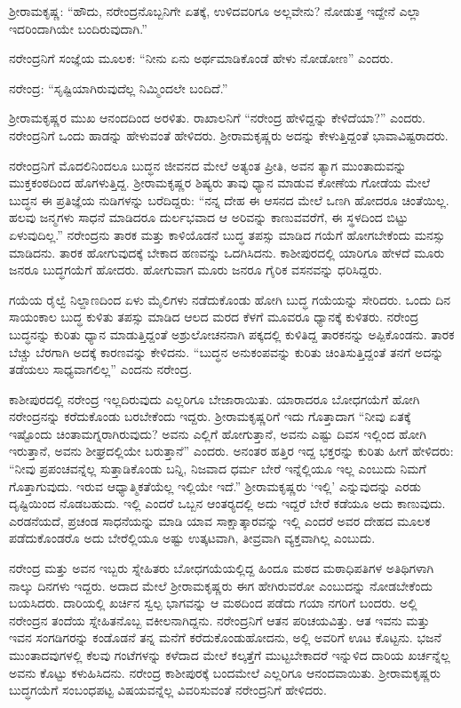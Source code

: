 ಶ‍್ರೀರಾಮಕೃಷ್ಣ: “ಹೌದು, ನರೇಂದ್ರನೊಬ್ಬನಿಗೇ ಏತಕ್ಕೆ, ಉಳಿದವರಿಗೂ ಅಲ್ಲವೇನು? ನೋಡುತ್ತ ಇದ್ದೇನೆ ಎಲ್ಲಾ ಇದರಿಂದಾಗಿಯೇ ಬಂದಿರುವುದಾಗಿ.”

ನರೇಂದ್ರನಿಗೆ ಸಂಜ್ಞೆಯ ಮೂಲಕ: “ನೀನು ಏನು ಅರ್ಥಮಾಡಿಕೊಂಡೆ ಹೇಳು ನೋಡೋಣ” ಎಂದರು.

ನರೇಂದ್ರ: “ಸೃಷ್ಟಿಯಾಗಿರುವುದೆಲ್ಲ ನಿಮ್ಮಿಂದಲೇ ಬಂದಿದೆ.”

ಶ‍್ರೀರಾಮಕೃಷ್ಣರ ಮುಖ ಆನಂದದಿಂದ ಅರಳಿತು. ರಾಖಾಲನಿಗೆ “ನರೇಂದ್ರ ಹೇಳಿದ್ದನ್ನು ಕೇಳಿದೆಯಾ?” ಎಂದರು. ನರೇಂದ್ರನಿಗೆ ಒಂದು ಹಾಡನ್ನು ಹೇಳುವಂತೆ ಹೇಳಿದರು. ಶ‍್ರೀರಾಮಕೃಷ್ಣರು ಅದನ್ನು ಕೇಳುತ್ತಿದ್ದಂತೆ ಭಾವಾವಿಷ್ಟರಾದರು.

ನರೇಂದ್ರನಿಗೆ ಮೊದಲಿನಿಂದಲೂ ಬುದ್ಧನ ಜೀವನದ ಮೇಲೆ ಅತ್ಯಂತ ಪ್ರೀತಿ, ಅವನ ತ್ಯಾಗ ಮುಂತಾದುವನ್ನು ಮುಕ್ತಕಂಠದಿಂದ ಹೊಗಳುತ್ತಿದ್ದ. ಶ‍್ರೀರಾಮಕೃಷ್ಣರ ಶಿಷ್ಯರು ತಾವು ಧ್ಯಾನ ಮಾಡುವ ಕೋಣೆಯ ಗೋಡೆಯ ಮೇಲೆ ಬುದ್ಧನ ಈ ಪ್ರತಿಜ್ಞೆಯ ನುಡಿಗಳನ್ನು ಬರೆದಿದ್ದರು: “ನನ್ನ ದೇಹ ಈ ಆಸನದ ಮೇಲೆ ಒಣಗಿ ಹೋದರೂ ಚಿಂತೆಯಿಲ್ಲ. ಹಲವು ಜನ್ಮಗಳು ಸಾಧನೆ ಮಾಡಿದರೂ ದುರ್ಲಭವಾದ ಆ ಅರಿವನ್ನು ಕಾಣುವವರೆಗೆ, ಈ ಸ್ಥಳದಿಂದ ಬಿಟ್ಟು ಏಳುವುದಿಲ್ಲ.” ನರೇಂದ್ರನು ತಾರಕ ಮತ್ತು ಕಾಳಿಯೊಡನೆ ಬುದ್ಧ ತಪಸ್ಸು ಮಾಡಿದ ಗಯೆಗೆ ಹೋಗಬೇಕೆಂದು ಮನಸ್ಸು ಮಾಡಿದನು. ತಾರಕ ಹೋಗುವುದಕ್ಕೆ ಬೇಕಾದ ಹಣವನ್ನು ಒದಗಿಸಿದನು. ಕಾಶೀಪುರದಲ್ಲಿ ಯಾರಿಗೂ ಹೇಳದೆ ಮೂರು ಜನರೂ ಬುದ್ಧಗಯೆಗೆ ಹೋದರು. ಹೋಗುವಾಗ ಮೂರು ಜನರೂ ಗೈರಿಕ ವಸನವನ್ನು ಧರಿಸಿದ್ದರು.

ಗಯೆಯ ರೈಲ್ವೆ ನಿಲ್ದಾಣದಿಂದ ಏಳು ಮೈಲಿಗಳು ನಡೆದುಕೊಂಡು ಹೋಗಿ ಬುದ್ಧ ಗಯೆಯನ್ನು ಸೇರಿದರು. ಒಂದು ದಿನ ಸಾಯಂಕಾಲ ಬುದ್ಧ ಕುಳಿತು ತಪಸ್ಸು ಮಾಡಿದ ಆಲದ ಮರದ ಕೆಳಗೆ ಮೂವರೂ ಧ್ಯಾನಕ್ಕೆ ಕುಳಿತರು. ನರೇಂದ್ರ ಬುದ್ಧನನ್ನು ಕುರಿತು ಧ್ಯಾನ ಮಾಡುತ್ತಿದ್ದಂತೆ ಅಶ್ರುಲೋಚನನಾಗಿ ಪಕ್ಕದಲ್ಲಿ ಕುಳಿತಿದ್ದ ತಾರಕನನ್ನು ಅಪ್ಪಿಕೊಂಡನು. ತಾರಕ ಬೆಚ್ಚು ಬೆರಗಾಗಿ ಅದಕ್ಕೆ ಕಾರಣವನ್ನು ಕೇಳಿದನು. “ಬುದ್ಧನ ಅನುಕಂಪವನ್ನು ಕುರಿತು ಚಿಂತಿಸುತ್ತಿದ್ದಂತೆ ತನಗೆ ಅದನ್ನು ತಡೆಯಲು ಸಾಧ್ಯವಾಗಲಿಲ್ಲ” ಎಂದನು ನರೇಂದ್ರ.

ಕಾಶೀಪುರದಲ್ಲಿ ನರೇಂದ್ರ ಇಲ್ಲದಿರುವುದು ಎಲ್ಲರಿಗೂ ಬೇಜಾರಾಯಿತು. ಯಾರಾದರೂ ಬೋಧಗಯೆಗೆ ಹೋಗಿ ನರೇಂದ್ರನನ್ನು ಕರೆದುಕೊಂಡು ಬರಬೇಕೆಂದು ಇದ್ದರು. ಶ‍್ರೀರಾಮಕೃಷ್ಣರಿಗೆ ಇದು ಗೊತ್ತಾದಾಗ “ನೀವು ಏತಕ್ಕೆ ಇಷ್ಟೊಂದು ಚಿಂತಾಮಗ್ನರಾಗಿರುವುದು? ಅವನು ಎಲ್ಲಿಗೆ ಹೋಗುತ್ತಾನೆ, ಅವನು ಎಷ್ಟು ದಿವಸ ಇಲ್ಲಿಂದ ಹೋಗಿ ಇರುತ್ತಾನೆ, ಅವನು ಶೀಘ್ರದಲ್ಲಿಯೇ ಬರುತ್ತಾನೆ” ಎಂದರು. ಅನಂತರ ಹತ್ತಿರ ಇದ್ದ ಭಕ್ತರನ್ನು ಕುರಿತು ಹೀಗೆ ಹೇಳಿದರು: “ನೀವು ಪ್ರಪಂಚವನ್ನೆಲ್ಲ ಸುತ್ತಾಡಿಕೊಂಡು ಬನ್ನಿ, ನಿಜವಾದ ಧರ್ಮ ಬೇರೆ ಇನ್ನೆಲ್ಲಿಯೂ ಇಲ್ಲ ಎಂಬುದು ನಿಮಗೆ ಗೊತ್ತಾಗುವುದು. ಇರುವ ಆಧ್ಯಾತ್ಮಿಕತೆಯೆಲ್ಲ ಇಲ್ಲಿಯೇ ಇದೆ.” ಶ‍್ರೀರಾಮಕೃಷ್ಣರು ‘ಇಲ್ಲಿ’ ಎನ್ನುವುದನ್ನು ಎರಡು ದೃಷ್ಟಿಯಿಂದ ನೊಡಬಹುದು. ಇಲ್ಲಿ ಎಂದರೆ ಒಬ್ಬನ ಆಂತರ‍್ಯದಲ್ಲಿ ಅದು ಇದ್ದರೆ ಬೇರೆ ಕಡೆಯೂ ಅದು ಕಾಣುವುದು. ಎರಡನೆಯದೆ, ಪ್ರಚಂಡ ಸಾಧನೆಯನ್ನು ಮಾಡಿ ಯಾವ ಸಾಕ್ಷಾತ್ಕಾರವನ್ನು ಇಲ್ಲಿ ಎಂದರೆ ಅವರ ದೇಹದ ಮೂಲಕ ಪಡೆದುಕೊಂಡರೊ ಅದು ಬೇರೆಲ್ಲಿಯೂ ಅಷ್ಟು ಉತ್ಕಟವಾಗಿ, ತೀವ್ರವಾಗಿ ವ್ಯಕ್ತವಾಗಿಲ್ಲ ಎಂಬುದು.

ನರೇಂದ್ರ ಮತ್ತು ಅವನ ಇಬ್ಬರು ಸ್ನೇಹಿತರು ಬೋಧಗಯೆಯಲ್ಲಿದ್ದ ಹಿಂದೂ ಮಠದ ಮಠಾಧಿಪತಿಗಳ ಅತಿಥಿಗಳಾಗಿ ನಾಲ್ಕು ದಿನಗಳು ಇದ್ದರು. ಅದಾದ ಮೇಲೆ ಶ‍್ರೀರಾಮಕೃಷ್ಣರು ಈಗ ಹೇಗಿರುವರೋ ಎಂಬುದನ್ನು ನೋಡಬೇಕೆಂದು ಬಯಸಿದರು. ದಾರಿಯಲ್ಲಿ ಖರ್ಚಿನ ಸ್ವಲ್ಪ ಭಾಗವನ್ನು ಆ ಮಠದಿಂದ ಪಡೆದು ಗಯಾ ನಗರಿಗೆ ಬಂದರು. ಅಲ್ಲಿ ನರೇಂದ್ರನ ತಂದೆಯ ಸ್ನೇಹಿತನೊಬ್ಬ ವಕೀಲನಾಗಿದ್ದನು. ನರೇಂದ್ರನಿಗೆ ಆತನ ಪರಿಚಯವಿತ್ತು. ಆತ ಇವನು ಮತ್ತು ಇವನ ಸಂಗಡಿಗರನ್ನು ಕಂಡೊಡನೆ ತನ್ನ ಮನೆಗೆ ಕರೆದುಕೊಂಡುಹೋದನು, ಅಲ್ಲಿ ಅವರಿಗೆ ಊಟ ಕೊಟ್ಟನು. ಭಜನೆ ಮುಂತಾದವುಗಳಲ್ಲಿ ಕೆಲವು ಗಂಟೆಗಳನ್ನು ಕಳೆದಾದ ಮೇಲೆ ಕಲ್ಕತ್ತೆಗೆ ಮುಟ್ಟಬೇಕಾದರೆ ಇನ್ನುಳಿದ ದಾರಿಯ ಖರ್ಚನ್ನೆಲ್ಲ ಅವನು ಕೊಟ್ಟು ಕಳುಹಿಸಿದನು. ನರೇಂದ್ರ ಕಾಶೀಪುರಕ್ಕೆ ಬಂದಮೇಲೆ ಎಲ್ಲರಿಗೂ ಆನಂದವಾಯಿತು. ಶ‍್ರೀರಾಮಕೃಷ್ಣರು ಬುದ್ಧಗಯೆಗೆ ಸಂಬಂಧಪಟ್ಟ ವಿಷಯವನ್ನೆಲ್ಲ ವಿವರಿಸುವಂತೆ ನರೇಂದ್ರನಿಗೆ ಹೇಳಿದರು.

